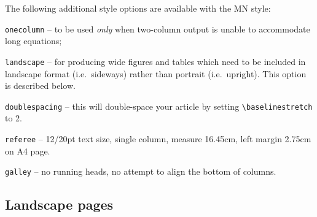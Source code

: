 The following additional style options are available with the MN style:
\begin{description}
  \item {\tt onecolumn} -- to be used {\it only} when two-column output
        is unable to accommodate long equations;
  \item {\tt landscape} -- for producing wide figures and tables which
        need to be included in landscape format (i.e.\ sideways) rather
        than portrait (i.e.\ upright). This option is described below. 
  \item {\tt doublespacing} -- this will double-space your 
        article by setting \verb"\baselinestretch" to 2.
  \item {\tt referee} -- 12/20pt text size, single column,
        measure 16.45cm, left margin 2.75cm on A4 page.
  \item {\tt galley} -- no running heads, no attempt to align
        the bottom of columns.
\end{description}

\subsection{Landscape pages}

